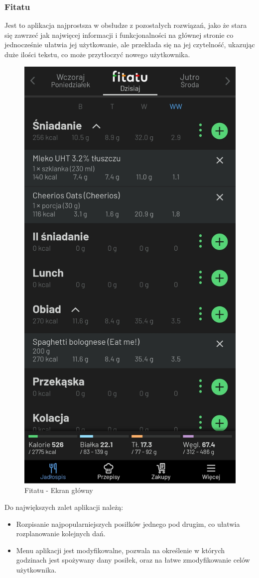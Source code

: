 \documentclass[12pt, a4paper]{article}
\begin{document}
\begin{sloppypar}
{{    \subsubsection{Fitatu}
    {
      Jest to aplikacja najprostsza w obsłudze z pozostałych rozwiązań, jako że stara się
      zawrzeć jak najwięcej informacji i funkcjonalności na głównej stronie co jednocześnie
      ułatwia jej użytkowanie, ale przekłada się na jej czytelność, ukazując duże ilości
      tekstu, co może przytłoczyć nowego użytkownika.
      \begin{figure}[H]
        \centering
        \includegraphics[width=.4\textwidth]{fitatu_pro_1.jpg}
        \caption{Fitatu - Ekran główny}
        \label{fig:fit1}
      \end{figure} 
      Do największych zalet aplikacji należą:
      \begin{itemize}
        \item Rozpisanie najpopularniejszych posiłków jednego pod drugim, co ułatwia
        rozplanowanie kolejnych dań.
        \item Menu aplikacji jest modyfikowalne, pozwala na określenie w których godzinach
        jest spożywany dany posiłek, oraz na łatwe zmodyfikowanie celów użytkownika.
        \begin{figure}[H]
          \centering
          \begin{subfigure}{.5\textwidth}
            \centering

\end{subfigure}
\end{figure}
\end{itemize}}}}
\end{sloppypar}
\end{document}
